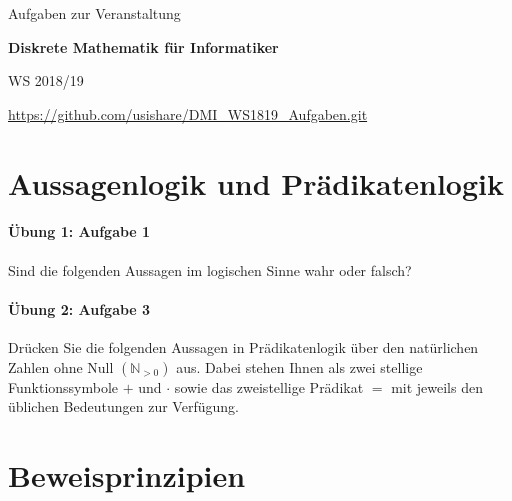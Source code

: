 \documentclass
[
  draft    = true,
  fontsize = 11pt,
  parskip  = half-,
  BCOR     = 0pt,
  DIV      = 11,
  ngerman,
  dvipsnames
]
{scrartcl}
\begin{document}

\thispagestyle{empty}
\begin{center}
  \vspace*{\fill}
  \normalsize
  \normalfont
  Aufgaben zur Veranstaltung\par
  \vspace{\baselineskip}
  \LARGE
  \bfseries
  Diskrete Mathematik für Informatiker\par
  \vspace{2\baselineskip}
  \normalsize
  \normalfont
  WS 2018/19\par
  \vspace*{\fill}
  \vspace*{\fill}
  \url{https://github.com/usishare/DMI_WS1819_Aufgaben.git}
\end{center}

\clearpage
{}

\tableofcontents

\clearpage
{}

\section{Aussagenlogik und Prädikatenlogik}

\paragraph{Übung 1: Aufgabe 1}
Sind die folgenden Aussagen im logischen Sinne wahr oder falsch?

\paragraph{Übung 2: Aufgabe 3}
Drücken Sie die folgenden Aussagen in Prädikatenlogik über den natürlichen
Zahlen ohne Null $(\mathbb{N}_{>0})$ aus. Dabei stehen Ihnen als zwei stellige
Funktionssymbole $+$ und $\cdot$ sowie das zweistellige Prädikat $=$ mit jeweils
den üblichen Bedeutungen zur Verfügung.

\section{Beweisprinzipien}
\end{document}

